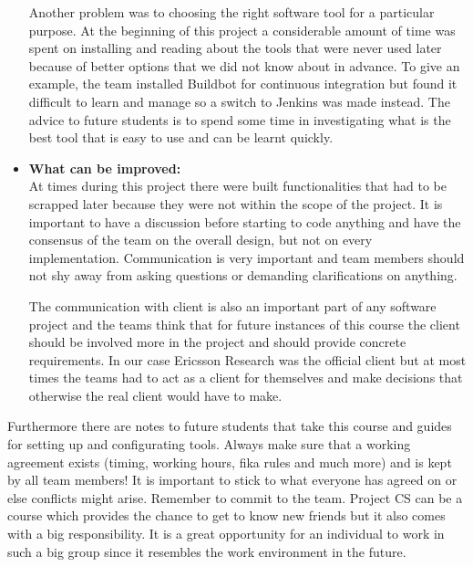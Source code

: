 \begin{itemize}
Another problem was to choosing the right software tool for a particular purpose. At the 
beginning of this project a considerable amount of time was spent on installing and reading about the tools that were never 
used later because of better options that we did not know about in advance. To give an example, the team installed Buildbot for continuous integration but found 
it difficult to learn and manage so a switch to Jenkins was made instead. The advice to future students is to 
spend some time in investigating what is the best tool that is easy to use and can be learnt quickly.

\item{\textbf{What can be improved:}}\\
 At times during this project there were built functionalities that had to be scrapped later because they were not 
 within the scope of the project. It is important to have a discussion before starting to code anything 
 and have the consensus of the team on the overall design, but not on every implementation. Communication is very important and team members should not shy away from asking 
 questions or demanding clarifications on anything.  
 
The communication with client is also an important part of any software project and the teams think that 
for future instances of this course the client should be involved more in the project and should 
provide concrete requirements. In our case Ericsson Research was the official client 
but at most times the teams had to act as a client for themselves and make decisions that otherwise the real 
client would have to make. 
\end{itemize}

Furthermore there are notes to future students that take this course and guides for setting up and configurating tools.
Always make sure that a working agreement exists (timing, working hours, fika rules and much more) and
is kept by all team members! It is important to stick to what everyone has agreed on or else
conflicts might arise. 
Remember to commit to the team. Project CS can be a course which provides the chance to get to know new friends but it also comes with a big responsibility.
It is a great opportunity for an individual to work in such a big group since
it resembles  the work environment in the future.
